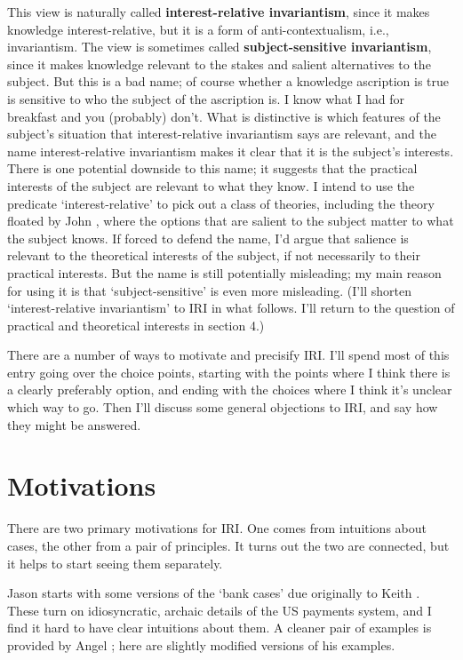 This view is naturally called \textbf{interest-relative invariantism}, since it makes knowledge interest-relative, but it is a form of anti-contextualism, i.e., invariantism. The view is sometimes called \textbf{subject-sensitive invariantism}, since it makes knowledge relevant to the stakes and salient alternatives to the subject. But this is a bad name; of course whether a knowledge ascription is true is sensitive to who the subject of the ascription is. I know what I had for breakfast and you (probably) don't. What is distinctive is which features of the subject's situation that interest-relative invariantism says are relevant, and the name interest-relative invariantism makes it clear that it is the subject's interests. There is one potential downside to this name; it suggests that the practical interests of the subject are relevant to what they know. I intend to use the predicate `interest-relative' to pick out a class of theories, including the theory floated by John  \citet{Hawthorne2004}, where the options that are salient to the subject matter to what the subject knows. If forced to defend the name, I'd argue that salience is relevant to the theoretical interests of the subject, if not necessarily to their practical interests. But the name is still potentially misleading; my main reason for using it is that `subject-sensitive' is even more misleading. (I'll shorten `interest-relative invariantism' to IRI in what follows. I'll return to the question of practical and theoretical interests in section 4.)

There are a number of ways to motivate and precisify IRI. I'll spend most of this entry going over the choice points, starting with the points where I think there is a clearly preferably option, and ending with the choices where I think it's unclear which way to go. Then I'll discuss some general objections to IRI, and say how they might be answered.

\section{Motivations}
\label{motivations}

There are two primary motivations for IRI. One comes from intuitions about cases, the other from a pair of principles. It turns out the two are connected, but it helps to start seeing them separately.

Jason  \citet{Stanley2005} starts with some versions of the `bank cases' due originally to Keith  \citet{DeRose1992}. These turn on idiosyncratic, archaic details of the US payments system, and I find it hard to have clear intuitions about them. A cleaner pair of examples is provided by Angel  \citet{Pinillos2012}; here are slightly modified versions of his examples.

